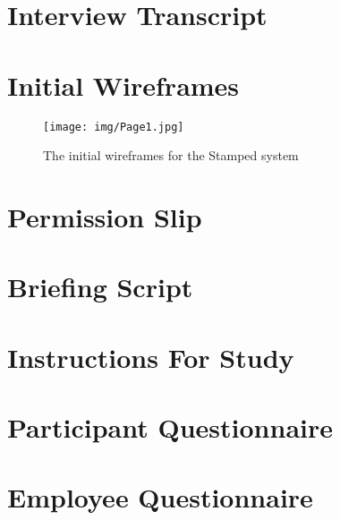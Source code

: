 \documentclass[11pt,openright,a4paper]{report}
\begin{document}
\chapter{Interview Transcript}

\chapter{Initial Wireframes}
\begin{figure}[H]
 \centering
  \texttt{[image: img/Page1.jpg]}
     \caption{The initial wireframes for the Stamped system}
\end{figure}
\chapter{Permission Slip}

\chapter{Briefing Script}

\chapter{Instructions For Study}

\chapter{Participant Questionnaire}

\chapter{Employee Questionnaire}

\end{document}
